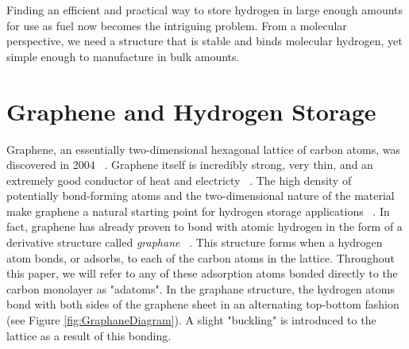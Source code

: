 \documentclass[oneside, noacknowlegments]{BYUPhys}
\begin{document}
Finding an efficient and practical way to store hydrogen in large
enough amounts for use as fuel now becomes the intriguing problem.
From a molecular perspective, we need a structure that is stable 
and binds molecular hydrogen, yet simple enough to manufacture 
in bulk amounts.

\section{Graphene and Hydrogen Storage}
\label{sec:graphene}

Graphene, an essentially two-dimensional hexagonal lattice of 
carbon atoms, was discovered in 2004 ~\cite{NovoselovGeim2004}. 
Graphene itself is incredibly strong, very thin, and an extremely 
good conductor of heat and electricty ~\cite{LeeWei2008}. The high 
density of potentially bond-forming atoms and the two-dimensional 
nature of the material make graphene a natural starting point for 
hydrogen storage applications ~\cite{Pumera2011}. In fact, 
graphene has already proven to bond with atomic hydrogen in the 
form of a derivative structure called \textit{graphane}
~\cite{SofoChaudhari2007, EliasNair2009}. This structure forms when 
a hydrogen atom bonds, or adsorbs, to each of the carbon atoms in 
the lattice. Throughout this paper, we will refer to any of these 
adsorption atoms bonded directly to the carbon monolayer as 
"adatoms".  In the graphane structure, the hydrogen atoms bond with 
both sides of the graphene sheet in an alternating top-bottom 
fashion (see Figure \ref{fig:GraphaneDiagram}). A slight "buckling" 
is introduced to the lattice as a result of this bonding.
\end{document}
